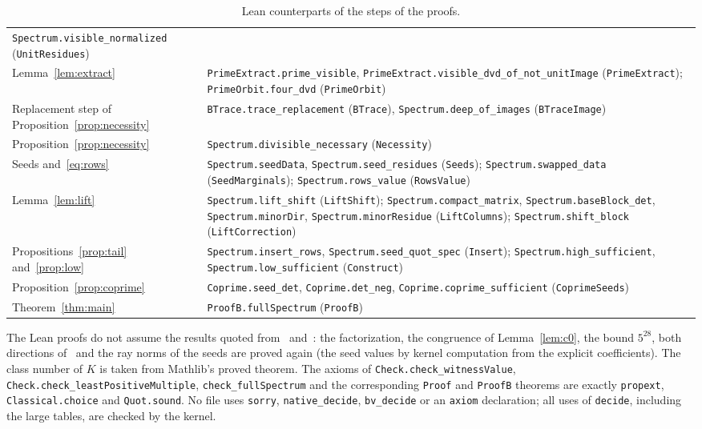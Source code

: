 \documentclass[11pt]{article}
\theoremstyle{definition}
\theoremstyle{remark}
\begin{document}
{\begin{table}[!htbp]
\begin{tabular}{@{}>{\raggedright\arraybackslash}p{}>{\raggedright\arraybackslash}p{}@{}}
\texttt{Spectrum.visible\_normalized} (\texttt{UnitResidues}) \\
Lemma~\ref{lem:extract} &
\texttt{PrimeExtract.prime\_visible}, \texttt{PrimeExtract.visible\_dvd\_of\_not\_unitImage}
(\texttt{PrimeExtract}); \texttt{PrimeOrbit.four\_dvd} (\texttt{PrimeOrbit}) \\
Replacement step of Proposition~\ref{prop:necessity} &
\texttt{BTrace.trace\_replacement} (\texttt{BTrace}), \texttt{Spectrum.deep\_of\_images}
(\texttt{BTraceImage}) \\
Proposition~\ref{prop:necessity} & \texttt{Spectrum.divisible\_necessary} (\texttt{Necessity}) \\
Seeds and~\eqref{eq:rows} &
\texttt{Spectrum.seedData}, \texttt{Spectrum.seed\_residues} (\texttt{Seeds});
\texttt{Spectrum.swapped\_data} (\texttt{SeedMarginals}); \texttt{Spectrum.rows\_value} (\texttt{RowsValue}) \\
Lemma~\ref{lem:lift} &
\texttt{Spectrum.lift\_shift} (\texttt{LiftShift}); \texttt{Spectrum.compact\_matrix},
\texttt{Spectrum.baseBlock\_det}, \texttt{Spectrum.minorDir}, \texttt{Spectrum.minorResidue}
(\texttt{LiftColumns}); \texttt{Spectrum.shift\_block} (\texttt{LiftCorrection}) \\
Propositions~\ref{prop:tail} and~\ref{prop:low} &
\texttt{Spectrum.insert\_rows}, \texttt{Spectrum.seed\_quot\_spec} (\texttt{Insert});
\texttt{Spectrum.high\_sufficient}, \texttt{Spectrum.low\_sufficient} (\texttt{Construct}) \\
Proposition~\ref{prop:coprime} &
\texttt{Coprime.seed\_det}, \texttt{Coprime.det\_neg}, \texttt{Coprime.coprime\_sufficient}
(\texttt{CoprimeSeeds}) \\
Theorem~\ref{thm:main} & \texttt{ProofB.fullSpectrum} (\texttt{ProofB}) \\
\hline
\end{tabular}
\caption{Lean counterparts of the steps of the proofs.}
\label{tab:lean}
\end{table}

\noindent The Lean proofs do not assume the results quoted
from~\cite{mp} and~\cite{pan25}: the factorization, the congruence of
Lemma~\ref{lem:c0}, the bound $5^{28}$, both directions of~\cite[Corollary~3.2]{mp}
and the ray norms of the seeds are proved again (the seed values by kernel
computation from the explicit coefficients). The class number of $K$ is taken
from Mathlib's proved theorem. The axioms of \texttt{Check.check\_witnessValue},
\texttt{Check.check\_leastPositiveMultiple}, \texttt{check\_fullSpectrum} and
the corresponding \texttt{Proof} and \texttt{ProofB} theorems are exactly
\texttt{propext}, \texttt{Classical.choice} and \texttt{Quot.sound}. No file uses
\texttt{sorry}, \texttt{native\_\allowbreak decide},
\texttt{bv\_\allowbreak decide} or an \texttt{axiom} declaration; all uses of
\texttt{decide}, including the large tables, are checked by the kernel.

}
\end{document}
